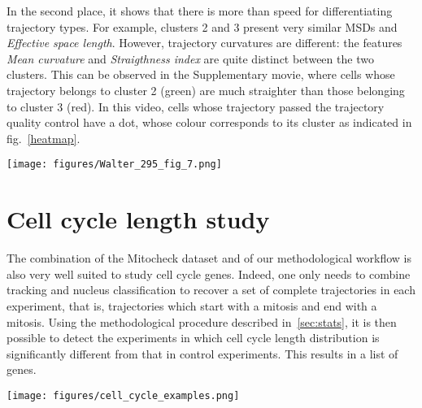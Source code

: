 In the second place, it shows that there is more than speed for
differentiating trajectory types. For example, clusters 2 and 3
present very similar MSDs and \textit{Effective space
  length}. However, trajectory curvatures are different: the features
\textit{Mean curvature} and \textit{Straigthness index} are quite
distinct between the two clusters. This can be observed in the
Supplementary movie, where cells whose trajectory belongs to cluster 2
(green) are much straighter than those belonging to cluster 3
(red). In this video, cells whose trajectory passed the trajectory
quality control have a dot, whose colour corresponds to its cluster as
indicated in fig.~\ref{heatmap}. 

\begin{figure*}[t!]
\centerline{\texttt{[image: figures/Walter\_295\_fig\_7.png]}}
\caption{Characterization of our ontology of trajectories. Each column is a single cell trajectory ; trajectories are grouped by cluster label. 1,000 trajectories were randomly selected per trajectory cluster.}
\label{heatmap}
\end{figure*}
\section{Cell cycle length study}
\label{sec:cellcycle}
The combination of the Mitocheck dataset and of our methodological
workflow is also very well suited to study cell cycle genes. Indeed,
one only needs to combine tracking and nucleus classification to
recover a set of complete trajectories in each experiment, that is,
trajectories which start with a mitosis and end with a mitosis. Using
the methodological procedure described in~\ref{sec:stats}, it is then
possible to detect the experiments in which cell cycle length
distribution is significantly different from that in control
experiments. This results in a list of genes. 
\begin{figure*}[ht!]
\centerline{\texttt{[image: figures/cell\_cycle\_examples.png]}}
\caption{Examples of object divisions from the Mitocheck dataset}
\label{cellcycle2}
\end{figure*}
